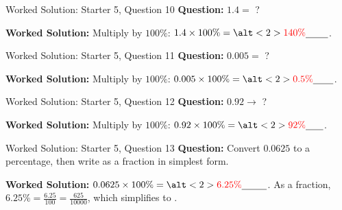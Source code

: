 \documentclass{beamer}
\newcommand{\ablank}[1]{%
  \alt<2>{\textcolor{red}{#1}}{\underline{\phantom{#1}}}%
}
\begin{document}
\begin{frame}[t]{Worked Solution: Starter 5, Question 10}
\textbf{Question:} \(1.4 =\) ?

\smallskip
\textbf{Worked Solution:} Multiply by \(100\%\): \(1.4 \times 100\% = \ablank{140\%}\).
\end{frame}

\begin{frame}[t]{Worked Solution: Starter 5, Question 11}
\textbf{Question:} \(0.005 =\) ?

\smallskip
\textbf{Worked Solution:} Multiply by \(100\%\): \(0.005 \times 100\% = \ablank{0.5\%}\).
\end{frame}

\begin{frame}[t]{Worked Solution: Starter 5, Question 12}
\textbf{Question:} \(0.92 \to\) ?

\smallskip
\textbf{Worked Solution:} Multiply by \(100\%\): \(0.92 \times 100\% = \ablank{92\%}\).
\end{frame}

\begin{frame}[t]{Worked Solution: Starter 5, Question 13}
\textbf{Question:} Convert \(0.0625\) to a percentage, then write as a fraction in simplest form.

\smallskip
\textbf{Worked Solution:} \(0.0625 \times 100\% = \ablank{6.25\%}\). As a fraction, \(6.25\% = \frac{6.25}{100} = \frac{625}{10000}\), which simplifies to \ablank{$\frac{1}{16}$}.
\end{frame}
\end{document}
